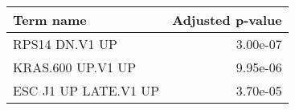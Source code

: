 \begin{tabular}{lr}
\toprule
           Term name &  Adjusted p-value \\
\midrule
      RPS14 DN.V1 UP &          3.00e-07 \\
   KRAS.600 UP.V1 UP &          9.95e-06 \\
ESC J1 UP LATE.V1 UP &          3.70e-05 \\
\bottomrule
\end{tabular}
